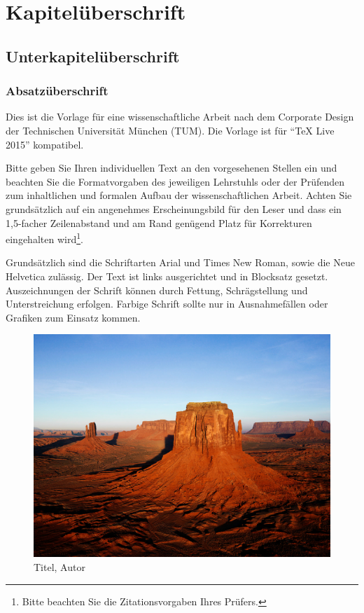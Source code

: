 
\chapter{Kapitel\"uberschrift}

\section{Unterkapitelüberschrift}

\subsection[]{Absatzüberschrift}

Dies ist die Vorlage für eine wissenschaftliche Arbeit nach dem Corporate
Design der Technischen Universität München (TUM). Die Vorlage ist für "`TeX
Live 2015"' kompatibel.

Bitte geben Sie Ihren individuellen Text an den vorgesehenen Stellen ein und
beachten Sie die Formatvorgaben des jeweiligen Lehrstuhls oder der Prüfenden
zum inhaltlichen und formalen Aufbau der wissenschaftlichen Arbeit. Achten Sie
grundsätzlich auf ein angenehmes Erscheinungsbild für den Leser und dass ein
1,5-facher Zeilenabstand und am Rand genügend Platz für Korrekturen
eingehalten wird\footnote{Bitte beachten Sie die Zitationsvorgaben Ihres
	Prüfers.}.

Grundsätzlich sind die Schriftarten Arial und Times New Roman, sowie die Neue
Helvetica zulässig. Der Text ist links ausgerichtet und in Blocksatz gesetzt.
Auszeichnungen der Schrift können durch Fettung, Schrägstellung und
Unterstreichung erfolgen. Farbige Schrift sollte nur in Ausnahmefällen oder
Grafiken zum Einsatz kommen.

\begin{figure}[!ht]
	\noindent\hspace{0.5mm}\includegraphics[width=12cm]{./Ressourcen/Desert.jpg}
	\caption{Titel, Autor}
\end{figure}

